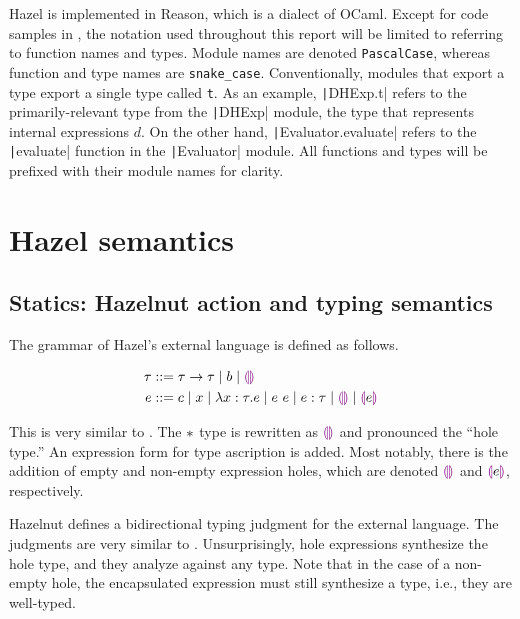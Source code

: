Hazel is implemented in Reason, which is a dialect of OCaml. Except for code samples in , the notation used throughout this report will be limited to referring to function names and types. Module names are denoted \texttt{PascalCase}, whereas function and type names are \texttt{snake\_case}. Conventionally, modules that export a type export a single type called \texttt{t}. As an example, \texttt|DHExp.t| refers to the primarily-relevant type from the \texttt|DHExp| module, the type that represents internal expressions $d$. On the other hand, \texttt|Evaluator.evaluate| refers to the \texttt|evaluate| function in the \texttt|Evaluator| module. All functions and types will be prefixed with their module names for clarity.

\section{Hazel semantics}
\label{sec:hazel-semantics}

\subsection{Statics: Hazelnut action and typing semantics}
\label{sec:hazel-statics}

The grammar of Hazel's external language is defined as follows.

\begin{singlespace}
  \begin{align*}
    \tau &::= \tau\to\tau
           \mid b
           \mid \textcolor{violet}{\llparenthesis}\textcolor{violet}{\rrparenthesis} \\
    e &::= c
        \mid x
        \mid\lambda x:\tau.e
        \mid e\ e
        \mid e:\tau
        \mid \textcolor{violet}{\llparenthesis}\textcolor{violet}{\rrparenthesis}
        \mid \textcolor{violet}{\llparenthesis} e\textcolor{violet}{\rrparenthesis}
  \end{align*}
\end{singlespace}

This is very similar to \gtlc{}. The $*{}$ type is rewritten as $\textcolor{violet}{\llparenthesis}\textcolor{violet}{\rrparenthesis}$ and pronounced the ``hole type.'' An expression form for type ascription is added. Most notably, there is the addition of empty and non-empty expression holes, which are denoted $\textcolor{violet}{\llparenthesis}\textcolor{violet}{\rrparenthesis}$ and $\textcolor{violet}{\llparenthesis} e\textcolor{violet}{\rrparenthesis}$, respectively.

Hazelnut \cite{conf/popl/Hazelnut17} defines a bidirectional typing judgment for the external language.  The judgments are very similar to \gtlc{}. Unsurprisingly, hole expressions synthesize the hole type, and they analyze against any type. Note that in the case of a non-empty hole, the encapsulated expression must still synthesize a type, i.e., they are well-typed.

